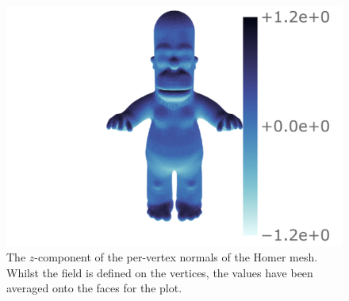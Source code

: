 \begin{figure}[htpb]
    \hspace{35mm}\capstart{}
    \includegraphics[trim={156 8 21 6},clip,width=.7\textwidth]{homer_field.pdf}
    \caption[
        An example field on the Homer mesh
    ]{
        The \(z\)-component of the per-vertex normals of the Homer mesh.
        Whilst the field is defined on the vertices, the values have been averaged onto the faces for the plot.
    }\label{fig:chapter5_homer_data}
\end{figure}
